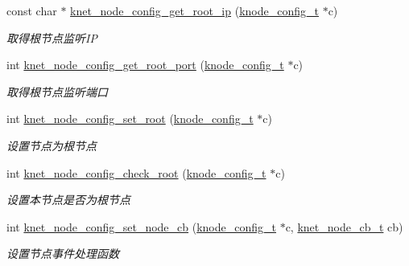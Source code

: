 \begin{DoxyCompactItemize}
const char $\ast$ \hyperlink{a00104_a529df491163ba265d6fc9b2d2d0b199d_a529df491163ba265d6fc9b2d2d0b199d}{knet\+\_\+node\+\_\+config\+\_\+get\+\_\+root\+\_\+ip} (\hyperlink{a00066_af1cfaee0eb1c76ebf06076b95cc47ee1_af1cfaee0eb1c76ebf06076b95cc47ee1}{knode\+\_\+config\+\_\+t} $\ast$c)
\begin{DoxyCompactList}\small\item\em 取得根节点监听\+I\+P \end{DoxyCompactList}\item 
int \hyperlink{a00104_a92a289991e2f79d472118d15153231b3_a92a289991e2f79d472118d15153231b3}{knet\+\_\+node\+\_\+config\+\_\+get\+\_\+root\+\_\+port} (\hyperlink{a00066_af1cfaee0eb1c76ebf06076b95cc47ee1_af1cfaee0eb1c76ebf06076b95cc47ee1}{knode\+\_\+config\+\_\+t} $\ast$c)
\begin{DoxyCompactList}\small\item\em 取得根节点监听端口 \end{DoxyCompactList}\item 
int \hyperlink{a00104_a19e111bf3ecf6b1ef52b6374303ee5d2_a19e111bf3ecf6b1ef52b6374303ee5d2}{knet\+\_\+node\+\_\+config\+\_\+set\+\_\+root} (\hyperlink{a00066_af1cfaee0eb1c76ebf06076b95cc47ee1_af1cfaee0eb1c76ebf06076b95cc47ee1}{knode\+\_\+config\+\_\+t} $\ast$c)
\begin{DoxyCompactList}\small\item\em 设置节点为根节点 \end{DoxyCompactList}\item 
int \hyperlink{a00104_ae58212789e9236f88a4522a657699654_ae58212789e9236f88a4522a657699654}{knet\+\_\+node\+\_\+config\+\_\+check\+\_\+root} (\hyperlink{a00066_af1cfaee0eb1c76ebf06076b95cc47ee1_af1cfaee0eb1c76ebf06076b95cc47ee1}{knode\+\_\+config\+\_\+t} $\ast$c)
\begin{DoxyCompactList}\small\item\em 设置本节点是否为根节点 \end{DoxyCompactList}\item 
int \hyperlink{a00104_a2c910b387bed0b4ccb59701476c24c8d_a2c910b387bed0b4ccb59701476c24c8d}{knet\+\_\+node\+\_\+config\+\_\+set\+\_\+node\+\_\+cb} (\hyperlink{a00066_af1cfaee0eb1c76ebf06076b95cc47ee1_af1cfaee0eb1c76ebf06076b95cc47ee1}{knode\+\_\+config\+\_\+t} $\ast$c, \hyperlink{a00066_a09c2d1f8eef7dc82226691ce39b7c4d8_a09c2d1f8eef7dc82226691ce39b7c4d8}{knet\+\_\+node\+\_\+cb\+\_\+t} cb)
\begin{DoxyCompactList}\small\item\em 设置节点事件处理函数 \end{DoxyCompactList}\item 

\end{DoxyCompactItemize}
